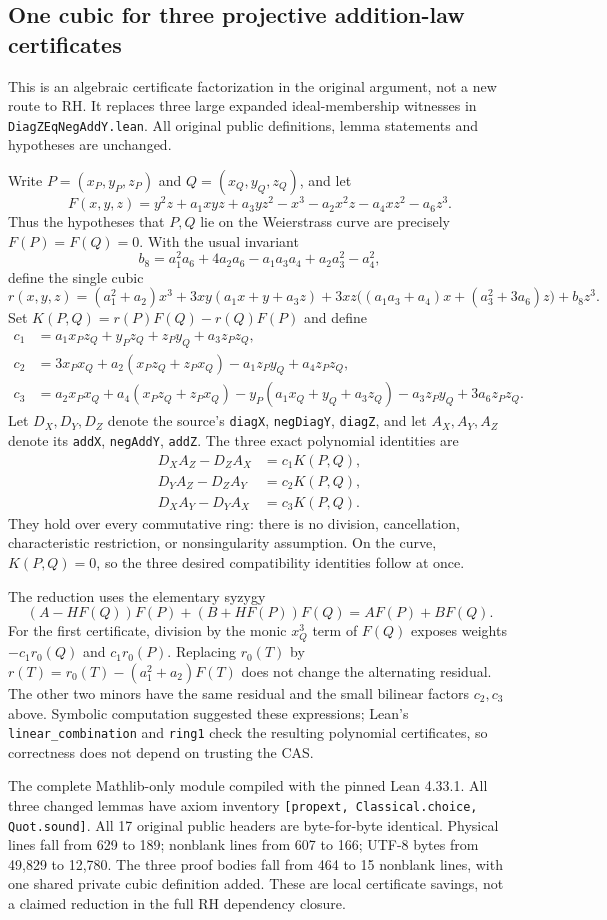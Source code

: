 \subsection*{One cubic for three projective addition-law certificates}

This is an algebraic certificate factorization in the original argument, not a
new route to RH. It replaces three large expanded ideal-membership witnesses
in \texttt{DiagZEqNegAddY.lean}. All original public definitions, lemma statements
and hypotheses are unchanged.

Write $P=(x_P,y_P,z_P)$ and $Q=(x_Q,y_Q,z_Q)$, and let
\[
 F(x,y,z)=y^2z+a_1xyz+a_3yz^2-x^3-a_2x^2z-a_4xz^2-a_6z^3.
\]
Thus the hypotheses that $P,Q$ lie on the Weierstrass curve are precisely
$F(P)=F(Q)=0$. With the usual invariant
\[
 b_8=a_1^2a_6+4a_2a_6-a_1a_3a_4+a_2a_3^2-a_4^2,
\]
define the single cubic
\[
 r(x,y,z)=(a_1^2+a_2)x^3+3xy(a_1x+y+a_3z)
       +3xz\bigl((a_1a_3+a_4)x+(a_3^2+3a_6)z\bigr)+b_8z^3.
\]
Set $K(P,Q)=r(P)F(Q)-r(Q)F(P)$ and define
\begin{align*}
 c_1&=a_1x_Pz_Q+y_Pz_Q+z_Py_Q+a_3z_Pz_Q,\\
 c_2&=3x_Px_Q+a_2(x_Pz_Q+z_Px_Q)-a_1z_Py_Q+a_4z_Pz_Q,\\
 c_3&=a_2x_Px_Q+a_4(x_Pz_Q+z_Px_Q)
       -y_P(a_1x_Q+y_Q+a_3z_Q)-a_3z_Py_Q+3a_6z_Pz_Q.
\end{align*}
Let $D_X,D_Y,D_Z$ denote the source's \texttt{diagX},
\texttt{negDiagY}, \texttt{diagZ}, and let $A_X,A_Y,A_Z$ denote its
\texttt{addX}, \texttt{negAddY}, \texttt{addZ}. The three exact polynomial
identities are
\begin{align*}
 D_XA_Z-D_ZA_X&=c_1K(P,Q),\\
 D_YA_Z-D_ZA_Y&=c_2K(P,Q),\\
 D_XA_Y-D_YA_X&=c_3K(P,Q).
\end{align*}
They hold over every commutative ring: there is no division, cancellation,
characteristic restriction, or nonsingularity assumption. On the curve,
$K(P,Q)=0$, so the three desired compatibility identities follow at once.

The reduction uses the elementary syzygy
\[
 (A-HF(Q))F(P)+(B+HF(P))F(Q)=AF(P)+BF(Q).
\]
For the first certificate, division by the monic $x_Q^3$ term of $F(Q)$ exposes
weights $-c_1r_0(Q)$ and $c_1r_0(P)$. Replacing
$r_0(T)$ by $r(T)=r_0(T)-(a_1^2+a_2)F(T)$ does not change the alternating
residual. The other two minors have the same residual and the small bilinear
factors $c_2,c_3$ above. Symbolic computation suggested these expressions;
Lean's \texttt{linear\_combination} and \texttt{ring1} check the resulting
polynomial certificates, so correctness does not depend on trusting the CAS.

The complete Mathlib-only module compiled with the pinned Lean 4.33.1.
All three changed lemmas have axiom inventory
\texttt{[propext, Classical.choice, Quot.sound]}. All 17 original public
headers are byte-for-byte identical. Physical lines fall from 629 to 189;
nonblank lines from 607 to 166; UTF-8 bytes from 49,829 to 12,780.
The three proof bodies fall from 464 to 15 nonblank lines, with one shared
private cubic definition added. These are local certificate savings, not a
claimed reduction in the full RH dependency closure.
